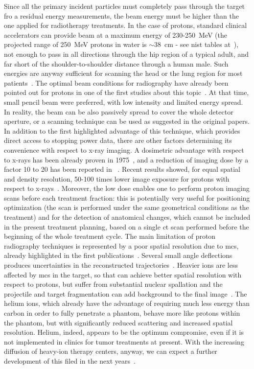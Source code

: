 Since all the primary incident particles must completely pass through the target fro a residual energy measurements, the beam energy must be higher than the one applied for radiotherapy treatments. In the case of protons, standard clinical accelerators can provide beam at a maximum energy of 230-250~MeV (the projected range of 250~MeV protons in water is $\sim$38~cm - see \gls{nist} tables at~\cite{NISTpstar}), not enough to pass in all directions through the hip region of a typical adult, and far short of the shoulder-to-shoulder distance through a human male. Such energies are anyway sufficient for scanning the head or the lung region for most patients~\parencite{Johnson2017}. The optimal beam conditions for radiography have already been pointed out for protons in one of the first studies about this topic~\parencite{Moffett1975}. At that time, small pencil beam were preferred, with low intensity and limited energy spread. In reality, the beam can be also passively spread to cover the whole detector aperture, or a scanning technique can be used as suggested in the original papers. In addition to the first highlighted advantage of this technique, which provides direct access to stopping power data, there are other factors determining its convenience with respect to x-ray imaging. A dosimetric advantage with respect to x-rays has been already proven in 1975~\parencite{Moffett1975}, and a reduction of imaging dose by a factor 10 to 20 has been reported in ~\cite{Schneider1995}. Recent results showed, for equal spatial and density resolution, 50-100 times lower image exposure for protons with respect to x-rays~\parencite{Schneider2004}. Moreover, the low dose enables one to perform proton imaging scans before each treatment fraction: this is potentially very useful for positioning optimization (the scan is performed under the same geometrical conditions as the treatment) and for the detection of anatomical changes, which cannot be included in the present treatment planning, based on a single \gls{ct} scan performed before the beginning of the whole treatment cycle. The main limitation of proton radiography techniques is represented by a poor spatial resolution due to \gls{mcs}, already highlighted in the first publications~\parencite{Koehler1968, Moffett1975}. Several small angle deflections produces uncertainties in the reconstructed trajectories~\parencite{Schneider1995, Schneider2004, Penfold2009}. Heavier ions are less affected by \gls{mcs} in the target, so that can achieve better spatial resolution with respect to protons, but suffer from substantial nuclear spallation and the projectile and target fragmentation can add background to the final image~\parencite{Parodi2014}. The helium ions, which already have the advantage of requiring much less energy than carbon in order to fully penetrate a phantom, behave more like protons within the phantom, but with significantly reduced scattering and increased spatial resolution. Helium, indeed, appears to be the optimum compromise, even if it is not implemented in clinics for tumor treatments at present. With the increasing diffusion of heavy-ion therapy centers, anyway, we can expect a further development of this filed in the next years~\parencite{Parodi2014}.
